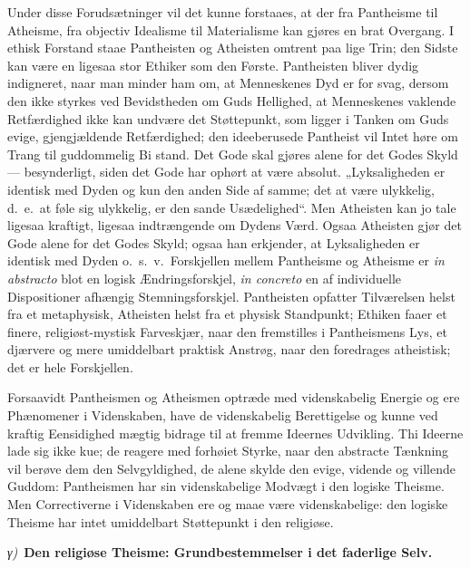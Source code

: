 \documentclass[12pt]{book}
\newcommand{\greekrun}[2]{%
  \medskip\begin{center}{\itshape #1)}\ {\bfseries #2}\end{center}\medskip}
\begin{document}
Under disse Forudsætninger vil det kunne forstaaes, at der fra
Pantheisme til Atheisme, fra objectiv Idealisme til Materialisme kan
gjøres en brat Overgang. I ethisk Forstand staae Pantheisten og
Atheisten omtrent paa lige Trin; den Sidste kan være en ligesaa stor
Ethiker som den Første. Pantheisten bliver dydig indigneret, naar
man minder ham om, at Menneskenes Dyd er for svag, dersom den ikke
styrkes ved Bevidstheden om Guds Hellighed, at Menneskenes vaklende
Retfærdighed ikke kan undvære det Støttepunkt, som ligger i Tanken
om Guds evige, gjengjældende Retfærdighed; den ideeberusede
Pantheist vil Intet høre om Trang til guddommelig Bi\-
stand. Det Gode skal gjøres alene for det Godes Skyld ---
besynderligt, siden det Gode har ophørt at være absolut.
„Lyksaligheden er identisk med Dyden og kun den anden Side af samme;
det at være ulykkelig, d.\ e.\ at føle sig ulykkelig, er den sande
Usædelighed“. Men Atheisten kan jo tale ligesaa kraftigt, ligesaa
indtrængende om Dydens Værd. Ogsaa Atheisten gjør det Gode alene
for det Godes Skyld; ogsaa han erkjender, at Lyksaligheden er
identisk med Dyden o.\ s.\ v.\ Forskjellen mellem Pantheisme og
Atheisme er \textit{in abstracto} blot en logisk
Ændringsforskjel, \textit{in concreto} en af individuelle
Dispositioner afhængig Stemningsforskjel. Pantheisten opfatter
Tilværelsen helst fra et metaphysisk, Atheisten helst fra et physisk
Standpunkt; Ethiken faaer et finere, religiøst-mystisk Farveskjær,
naar den fremstilles i Pantheismens Lys, et djærvere og mere
umiddelbart praktisk Anstrøg, naar den foredrages atheistisk; det er
hele Forskjellen.

Forsaavidt Pantheismen og Atheismen optræde med videnskabelig
Energie og ere Phænomener i Videnskaben, have de videnskabelig
Berettigelse og kunne ved kraftig Eensidighed mægtig bidrage til at
fremme Ideernes Udvikling. Thi Ideerne lade sig ikke kue; de reagere
med forhøiet Styrke, naar den abstracte Tænkning vil berøve dem den
Selvgyldighed, de alene skylde den evige, vidende og villende
Guddom: Pantheismen har sin videnskabelige Modvægt i den logiske
Theisme. Men Correctiverne i Videnskaben ere og maae være
videnskabelige: den logiske Theisme har intet umiddelbart
Støttepunkt i den religiøse.

\greekrun{γ}{Den religiøse Theisme: Grundbestemmelser i det faderlige
Selv.}
\end{document}
